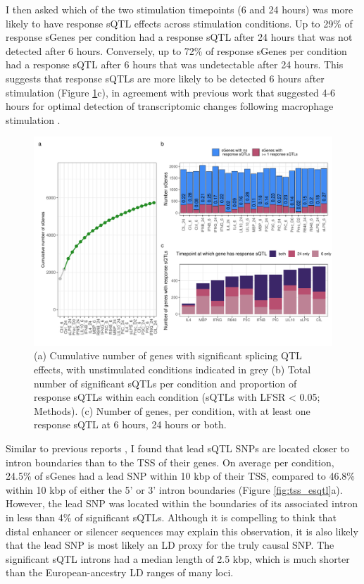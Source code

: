 I then asked which of the two stimulation timepoints (6 and 24 hours) was more likely to have response sQTL effects across stimulation conditions. Up to 29\% of response sGenes per condition had a response sQTL after 24 hours that was not detected after 6 hours. Conversely, up to 72\% of response sGenes per condition had a response sQTL after 6 hours that was  undetectable after 24 hours. This suggests that response sQTLs are more likely to be detected 6 hours after stimulation (Figure \ref{fig:sqtl}c), in agreement with previous work that suggested 4-6 hours for optimal detection of transcriptomic changes following macrophage stimulation \cite{Unuvar_Purcu2022-zq,Sharif2007-np}. \\
\begin{figure}[H]
  \centering
  \includegraphics[width=\textwidth]{sqtl}
  \caption[Splicing QTL mapping, timepoint-specificity and condition-specificity results]{(a) Cumulative number of genes with significant splicing QTL effects, with unstimulated conditions indicated in grey (b) Total number of significant sQTLs per condition and proportion of response sQTLs within each condition (sQTLs with LFSR < 0.05; Methods). (c) Number of genes, per condition, with at least one response sQTL at 6 hours, 24 hours or both.}
  \label{fig:sqtl}   
\end{figure}

Similar to previous reports \cite{Garrido-Martin2021-sk}, I found that lead sQTL SNPs are located closer to intron boundaries than to the TSS of their genes. On average per condition, 24.5\% of sGenes had a lead SNP within 10 kbp of their TSS, compared to 46.8\% within 10 kbp of either the 5' or 3' intron boundaries (Figure \ref{fig:tss_esqtl}a). However, the lead SNP was located within the boundaries of its associated intron in less than 4\% of significant sQTLs. Although it is compelling to think that distal enhancer or silencer sequences may explain this observation, it is also likely that the lead SNP is most likely an LD proxy for the truly causal SNP. The significant sQTL introns had a median length of 2.5 kbp, which is much shorter than the European-ancestry LD ranges of many loci. \\

